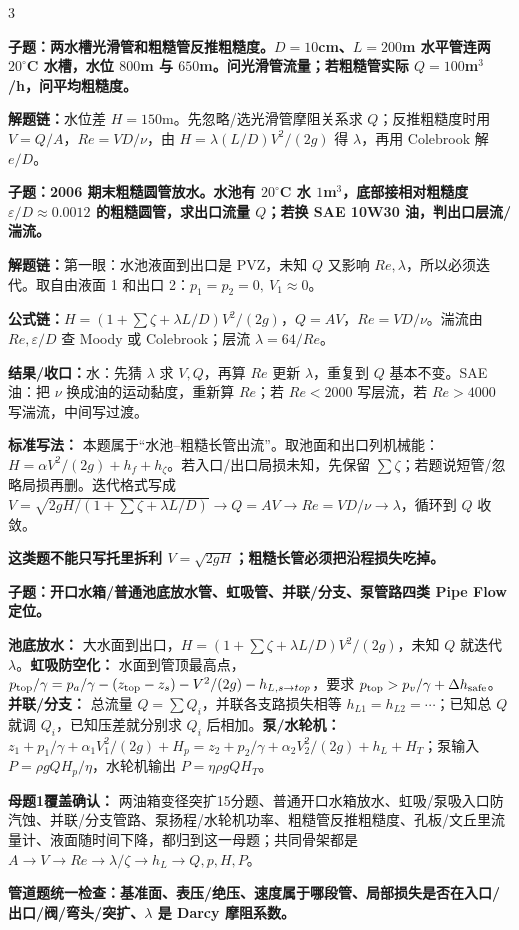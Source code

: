 \documentclass[a4paper]{article}
\newcommand{\qt}[1]{\vspace{0.10pt}\colorbox{Q}{\parbox{\dimexpr\linewidth-2\fboxsep}{\color{white}\bfseries #1}}\par}
\newcommand{\ans}[1]{\colorbox{G}{\parbox{\dimexpr\linewidth-2\fboxsep}{#1}}\par}
\newcommand{\warn}[1]{\colorbox{Y}{\parbox{\dimexpr\linewidth-2\fboxsep}{\color{E}\bfseries #1}}\par}
\newcommand{\chain}[1]{{\color{A}\bfseries 解题链：}#1\par}
\newcommand{\res}[1]{{\color{E}\bfseries 结果/收口：}#1\par}
\newcommand{\form}[1]{{\color{M}\bfseries 公式链：}#1\par}
\begin{document}
\begin{multicols}{3}
\qt{子题：两水槽光滑管和粗糙管反推粗糙度。$D=10$cm、$L=200$m 水平管连两 $20^\circ$C 水槽，水位 $800$m 与 $650$m。问光滑管流量；若粗糙管实际 $Q=100$m$^3$/h，问平均粗糙度。}
\chain{水位差 $H=150$m。先忽略/选光滑管摩阻关系求 $Q$；反推粗糙度时用 $V=Q/A$，$Re=VD/\nu$，由 $H=\lambda(L/D)V^2/(2g)$ 得 $\lambda$，再用 Colebrook 解 $e/D$。}

\qt{子题：2006 期末粗糙圆管放水。水池有 $20^\circ$C 水 $1$m$^3$，底部接相对粗糙度 $\varepsilon/D\approx0.0012$ 的粗糙圆管，求出口流量 $Q$；若换 SAE 10W30 油，判出口层流/湍流。}
\chain{第一眼：水池液面到出口是 PVZ，未知 $Q$ 又影响 $Re,\lambda$，所以必须迭代。取自由液面 1 和出口 2：$p_1=p_2=0,\ V_1\approx0$。}
\form{$H=\left(1+\sum\zeta+\lambda L/D\right)V^2/(2g)$，$Q=AV$，$Re=VD/\nu$。湍流由 $Re,\varepsilon/D$ 查 Moody 或 Colebrook；层流 $\lambda=64/Re$。}
\res{水：先猜 $\lambda$ 求 $V,Q$，再算 $Re$ 更新 $\lambda$，重复到 $Q$ 基本不变。SAE 油：把 $\nu$ 换成油的运动黏度，重新算 $Re$；若 $Re<2000$ 写层流，若 $Re>4000$ 写湍流，中间写过渡。}
\ans{\textbf{标准写法：} 本题属于“水池--粗糙长管出流”。取池面和出口列机械能：$H=\alpha V^2/(2g)+h_f+h_\zeta$。若入口/出口局损未知，先保留 $\sum\zeta$；若题说短管/忽略局损再删。迭代格式写成 $V=\sqrt{2gH/(1+\sum\zeta+\lambda L/D)}\to Q=AV\to Re=VD/\nu\to\lambda$，循环到 $Q$ 收敛。}
\warn{这类题不能只写托里拆利 $V=\sqrt{2gH}$；粗糙长管必须把沿程损失吃掉。}

\qt{子题：开口水箱/普通池底放水管、虹吸管、并联/分支、泵管路四类 Pipe Flow 定位。}
\ans{\textbf{池底放水：} 大水面到出口，$H=(1+\sum\zeta+\lambda L/D)V^2/(2g)$，未知 $Q$ 就迭代 $\lambda$。\textbf{虹吸防空化：} 水面到管顶最高点，$p_{\rm top}/\gamma=p_a/\gamma-(z_{\rm top}-z_s)-V^2/(2g)-h_{L,s\to top}$，要求 $p_{\rm top}>p_v/\gamma+\Delta h_{\rm safe}$。\textbf{并联/分支：} 总流量 $Q=\sum Q_i$，并联各支路损失相等 $h_{L1}=h_{L2}=\cdots$；已知总 $Q$ 就调 $Q_i$，已知压差就分别求 $Q_i$ 后相加。\textbf{泵/水轮机：} $z_1+p_1/\gamma+\alpha_1V_1^2/(2g)+H_p=z_2+p_2/\gamma+\alpha_2V_2^2/(2g)+h_L+H_T$；泵输入 $P=\rho gQH_p/\eta$，水轮机输出 $P=\eta\rho gQH_T$。}
\ans{\textbf{母题1覆盖确认：} 两油箱变径突扩15分题、普通开口水箱放水、虹吸/泵吸入口防汽蚀、并联/分支管路、泵扬程/水轮机功率、粗糙管反推粗糙度、孔板/文丘里流量计、液面随时间下降，都归到这一母题；共同骨架都是 $A\to V\to Re\to\lambda/\zeta\to h_L\to Q,p,H,P$。}
\warn{管道题统一检查：基准面、表压/绝压、速度属于哪段管、局部损失是否在入口/出口/阀/弯头/突扩、$\lambda$ 是 Darcy 摩阻系数。}


\end{multicols}
\end{document}
